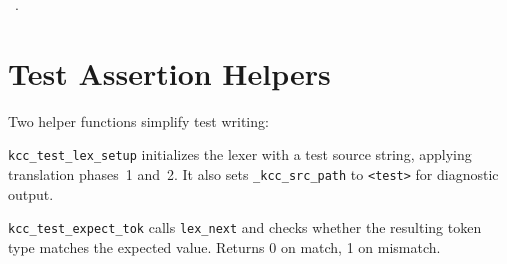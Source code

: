 \documentclass[11pt,a4paper,twoside,openright,DIV=15]{scrbook}
\theoremstyle{definition}
\theoremstyle{plain}
\theoremstyle{remark}
\begin{document}
\begin{flushleft}
\begin{minipage}{\linewidth}
\vspace{-1.5ex}
\footnotesize
\begin{list}{}{\setlength{\itemsep}{-\parsep}\setlength{\itemindent}{-\leftmargin}}
\item \NWtxtMacroRefIn\ .

\item{}
\end{list}
\end{minipage}\vspace{4ex}
\end{flushleft}
\section{Test Assertion Helpers}

Two helper functions simplify test writing:

\texttt{kcc\_test\_lex\_setup} initializes the lexer with a test
source string, applying translation phases~1 and~2.  It also sets
\texttt{\_kcc\_src\_path} to \texttt{<test>} for diagnostic output.

\texttt{kcc\_test\_expect\_tok} calls \texttt{lex\_next} and checks
whether the resulting token type matches the expected value.  Returns
0 on match, 1 on mismatch.
\end{document}
